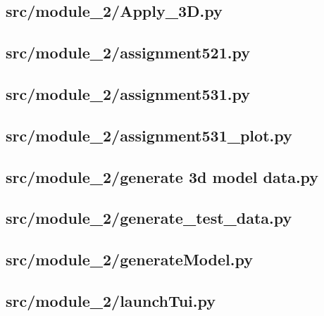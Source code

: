 \subsection*{src/module\_2/Apply\_3D.py}
\label{ap:Apply_3D}

\subsection*{src/module\_2/assignment521.py}
\label{ap:assignment521}

\subsection*{src/module\_2/assignment531.py}
\label{ap:assignment531}

\subsection*{src/module\_2/assignment531\_plot.py}
\label{ap:assignment531_plot}

\subsection*{src/module\_2/generate 3d model data.py}
\label{ap:generate_3d_model_data}

\subsection*{src/module\_2/generate\_test\_data.py}
\label{ap:module_2-generate_test_data}

\subsection*{src/module\_2/generateModel.py}
\label{ap:generateModel}

\subsection*{src/module\_2/launchTui.py}
\label{ap:module_2-launchTui}

